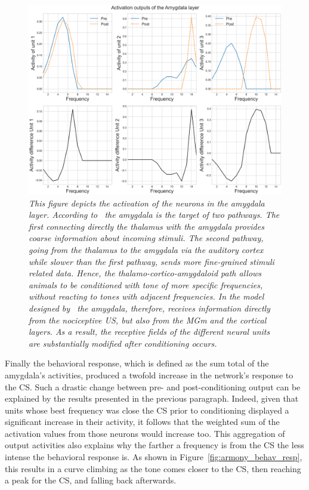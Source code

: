 \begin{figure}[!htbp]
   \begin{center}
      \includegraphics[width=\textwidth]{Figs/activation_amygdala}
      \caption{\textit{This figure depicts the activation of the neurons in the amygdala layer. According to~\citet{Ledoux1992} the amygdala is the target of two pathways. The first connecting directly the thalamus with the amygdala provides coarse information about incoming stimuli. The second pathway, going from the thalamus to the amygdala via the auditory cortex while slower than the first pathway, sends more fine-grained stimuli related data. Hence, the thalamo-cortico-amygdaloid path allows animals to be conditioned with tone of more specific frequencies, without reacting to tones with adjacent frequencies. In the model designed by~\citet{Armony1995} the amygdala, therefore, receives information directly from the nociceptive US, but also from the MGm and the cortical layers. As a result, the receptive fields of the different neural units are substantially modified after conditioning occurs.}}\label{fig:armony_act_amyg}
   \end{center}
\end{figure}

Finally the behavioral response, which is defined as the sum total of the amygdala's activities, produced a twofold increase in the network's response to the CS\@. Such a drastic change between pre- and post-conditioning output can be explained by the results presented in the previous paragraph. Indeed, given that units whose best frequency was close the CS prior to conditioning displayed a significant increase in their activity, it follows that the weighted sum of the activation values from those neurons would increase too. This aggregation of output activities also explains why the farther a frequency is from the CS the less intense the behavioral response is. As shown in Figure~\ref{fig:armony_behav_resp}, this results in a curve climbing as the tone comes closer to the CS, then reaching a peak for the CS, and falling back afterwards.

